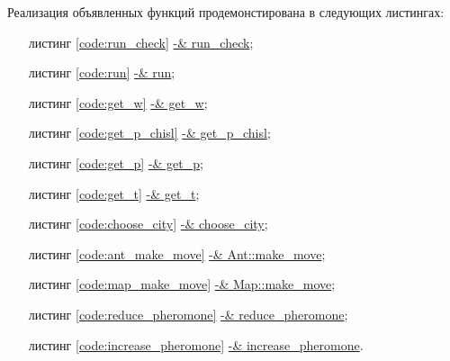 \documentclass[a4paper, 14pt]{article}
\begin{document}
    Реализация объявленных функций продемонстирована в следующих листингах:
    \begin{enumerate}
	\item[листинг \ref{code:run_check}] \hyperref[code:run_check]{ -& run\_check};

    \item[листинг \ref{code:run}]  \hyperref[code:run]{ -& run};
    
    \item[листинг \ref{code:get_w}] \hyperref[code:get_w]{ -& get\_w};
    
     \item[листинг \ref{code:get_p_chisl}] \hyperref[code:get_p_chisl]{ -& get\_p\_chisl};
    
    \item[листинг \ref{code:get_p}] \hyperref[code:get_p]{ -& get\_p};
    
    
    \item[листинг \ref{code:get_t}] \hyperref[code:get_t]{ -& get\_t};
   
   \item[листинг \ref{code:choose_city}] \hyperref[code:choose_city]{ -& choose\_city};
   
    \item[листинг \ref{code:ant_make_move}] \hyperref[code:ant_make_move]{ -& Ant::make\_move};
    
    \item[листинг \ref{code:map_make_move}] \hyperref[code:map_make_move]{ -& Map::make\_move};
    
    \item[листинг \ref{code:reduce_pheromone}] \hyperref[code:reduce_pheromone]{ -& reduce\_pheromone};
    
    \item[листинг \ref{code:increase_pheromone}] \hyperref[code:increase_pheromone]{ -& increase\_pheromone}.
    \end{enumerate}
   
\end{document}
